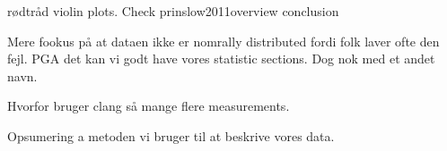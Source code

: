 rødtråd
violin plots.
Check prinslow2011overview conclusion

Mere fookus på at dataen ikke er nomrally distributed fordi folk laver ofte den fejl. PGA det kan vi godt have vores statistic sections. Dog nok med et andet navn. 

Hvorfor bruger clang så mange flere measurements.


Opsumering a metoden vi bruger til at beskrive vores data.



